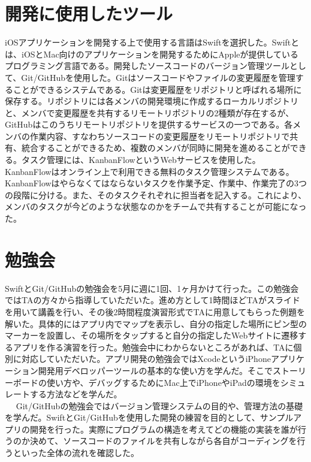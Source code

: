 \section{開発に使用したツール}

iOSアプリケーションを開発する上で使用する言語はSwiftを選択した。Swiftとは、iOSとMac向けのアプリケーションを開発するためにAppleが提供しているプログラミング言語である。開発したソースコードのバージョン管理ツールとして、Git/GitHubを使用した。Gitはソースコードやファイルの変更履歴を管理することができるシステムである。Gitは変更履歴をリポジトリと呼ばれる場所に保存する。リポジトリには各メンバの開発環境に作成するローカルリポジトリと、メンバで変更履歴を共有するリモートリポジトリの2種類が存在するが、GitHubはこのうちリモートリポジトリを提供するサービスの一つである。各メンバの作業内容、すなわちソースコードの変更履歴をリモートリポジトリで共有、統合することができるため、複数のメンバが同時に開発を進めることができる。タスク管理には、KanbanFlowというWebサービスを使用した。KanbanFlowはオンライン上で利用できる無料のタスク管理システムである。KanbanFlowはやらなくてはならないタスクを作業予定、作業中、作業完了の3つの段階に分ける。また、そのタスクそれぞれに担当者を記入する。これにより、メンバのタスクが今どのような状態なのかをチームで共有することが可能になった。

\section{勉強会}
SwiftとGit/GitHubの勉強会を5月に週に1回、1ヶ月かけて行った。この勉強会ではTAの方々から指導していただいた。進め方として1時間ほどTAがスライドを用いて講義を行い、その後2時間程度演習形式でTAに用意してもらった例題を解いた。具体的にはアプリ内でマップを表示し、自分の指定した場所にピン型のマーカーを設置し、その場所をタップすると自分の指定したWebサイトに遷移するアプリを作る演習を行った。勉強会中にわからないところがあれば、TAに個別に対応していただいた。アプリ開発の勉強会ではXcodeというiPhoneアプリケーション開発用デベロッパーツールの基本的な使い方を学んだ。そこでストーリーボードの使い方や、デバッグするためにMac上でiPhoneやiPadの環境をシミュレートする方法などを学んだ。\\　
Git/GitHubの勉強会ではバージョン管理システムの目的や、管理方法の基礎を学んだ。SwiftとGit/GitHubを使用した開発の練習を目的として、サンプルアプリの開発を行った。実際にプログラムの構造を考えてどの機能の実装を誰が行うのか決めて、ソースコードのファイルを共有しながら各自がコーディングを行うといった全体の流れを確認した。

